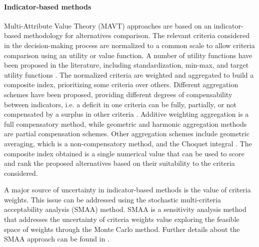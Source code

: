 \begin{refsection}[referencesCh1]
\paragraph{Indicator-based methods}
Multi-Attribute Value Theory (MAVT) approaches are based on an indicator-based methodology for alternatives comparison. The relevant criteria considered in the decision-making process are normalized to a common scale to allow criteria comparison using an utility or value function. A number of utility functions have been proposed in the literature, including standardization, min-max, and target utility functions \citep{HandbookCompositeIndicators}. 
The normalized criteria 
are weighted and aggregated to build a composite index, prioritizing some criteria over others. Different aggregation schemes have been proposed, providing different degrees of compensability between indicators, i.e. a deficit in one criteria can be fully, partially, or not compensated by a surplus in other criteria \citep{MarcoCinelli2020}. Additive weighting aggregation is a full compensatory method, while geometric and  harmonic aggregation methods are partial  compensation schemes. Other aggregation schemes include geometric averaging, which is a non-compensatory method, and the Choquet integral \citep{marichal2000determination}. The composite index obtained is a single numerical value that can be used to score and rank the proposed alternatives based on their suitability to the criteria considered. 

A major source of uncertainty in indicator-based methods is the value of criteria weights. This issue can be addressed using the stochastic multi-criteria acceptability analysis (SMAA) method. SMAA is a sensitivity analysis method that addresses the uncertainty of criteria weights value exploring the feasible space of weights through the Monte Carlo method. Further details about the SMAA approach can be found in \citet{tervonen_implementing_2007}.



\end{refsection}
